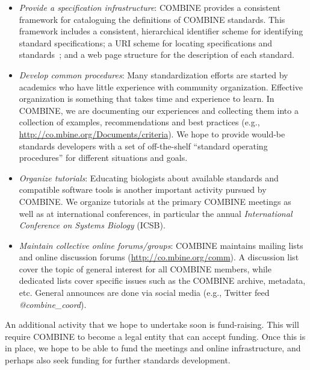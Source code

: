 \begin{itemize}
\item \emph{Provide a specification infrastructure}: COMBINE provides a consistent framework for cataloguing the definitions of COMBINE standards. This framework includes a consistent, hierarchical identifier scheme for identifying standard specifications; a URI scheme for locating specifications and standards~\cite[using Identifiers.org to provide permanent, resolvable URIs for standards;][]{Juty2012}; and a web page structure for the description of each standard.

\item \emph{Develop common procedures}: Many standardization efforts are started by academics who have little experience with community organization.  Effective organization is something that takes time and experience to learn.  In COMBINE, we are documenting our experiences and collecting them into a collection of examples, recommendations and best practices (e.g., \url{http://co.mbine.org/Documents/criteria}).  We hope to provide would-be standards developers with a set of off-the-shelf ``standard operating procedures'' for different situations and goals.

\item \emph{Organize tutorials}: Educating biologists about available standards and compatible software tools is another important activity pursued by COMBINE.  We organize tutorials at the primary COMBINE meetings as well as at international conferences, in particular the annual \emph{International Conference on Systems Biology} (ICSB).

\item \emph{Maintain collective online forums/groups}:  COMBINE maintains mailing lists and online discussion forums (\url{http://co.mbine.org/comm}).  A discussion list cover the topic of general interest for all COMBINE members, while dedicated lists cover specific issues such as the COMBINE archive, metadata, etc.  General announces are done via social media (e.g., Twitter feed \emph{@combine\_coord}).

\end{itemize}

An additional activity that we hope to undertake soon is fund-raising.  This will require COMBINE to become a legal entity that can accept funding.  Once this is in place, we hope to be able to fund the meetings and online infrastructure, and perhaps also seek funding for further standards development.


\clearpage
{}

